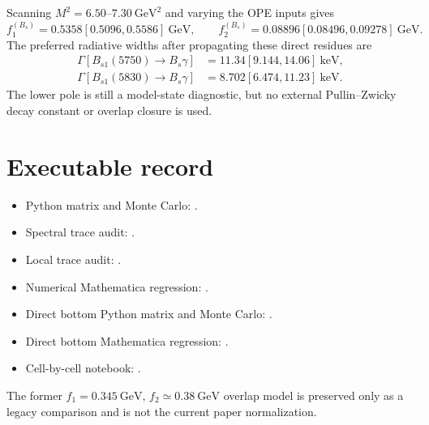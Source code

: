\documentclass[11pt]{article}
\newcommand{\GeV}{\mathrm{GeV}}
\newcommand{\keV}{\mathrm{keV}}
\begin{document}
Scanning $M^2=6.50$--$7.30~\GeV^2$ and varying the OPE inputs gives
\begin{equation}
f_1^{(B_s)}=0.5358[0.5096,0.5586]~\GeV,\qquad
f_2^{(B_s)}=0.08896[0.08496,0.09278]~\GeV .
\end{equation}
The preferred radiative widths after propagating these direct residues are
\begin{align}
\Gamma[B_{s1}(5750)\to B_s\gamma]
 &=11.34[9.144,14.06]~\keV,\\
\Gamma[B_{s1}(5830)\to B_s\gamma]
 &=8.702[6.474,11.23]~\keV.
\end{align}
The lower pole is still a model-state diagnostic, but no external
Pullin--Zwicky decay constant or overlap closure is used.

\section{Executable record}

\begingroup
\footnotesize
\begin{itemize}
  \item Python matrix and Monte Carlo: .
  \item Spectral trace audit: .
  \item Local trace audit: .
  \item Numerical Mathematica regression:
    .
  \item Direct bottom Python matrix and Monte Carlo:
    .
  \item Direct bottom Mathematica regression:
    .
  \item Cell-by-cell notebook:
    .
\end{itemize}
\endgroup

The former $f_1=0.345~\GeV$, $f_2\simeq0.38~\GeV$ overlap model is preserved
only as a legacy comparison and is not the current paper normalization.
\end{document}
